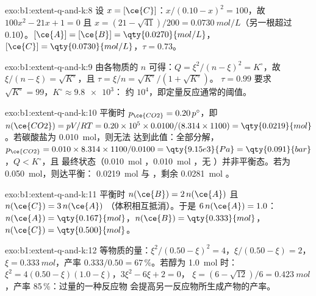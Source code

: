 \begin{solution}{exo:b1:extent-q-and-k:8}
设 $x = [\ce{C}]$：$x/(0.10 - x)^2 = 100$，故 $100x^2 - 21x + 1 = 0$ 且
$x = (21 - \sqrt{41})/200 = \qty{0.0730}{mol/L}$（另一根超过
0.10）。$[\ce{A}] = [\ce{B}] = \qty{0.0270}{mol/L}$，$[\ce{C}] =
\qty{0.0730}{mol/L}$，$\tau = 0.73$。
\end{solution}

\begin{solution}{exo:b1:extent-q-and-k:9}
由各物质的 $n$ 可得：$Q = \xi^2/(n - \xi)^2 = K^\circ$，故 $\xi/(n - \xi) =
\sqrt{K^\circ}$，且 $\tau = \xi/n = \sqrt{K^\circ}/(1 + \sqrt{K^\circ})$。
$\tau = 0.99$ 要求 $\sqrt{K^\circ} = 99$，$K^\circ \approx \num{9.8e3}$：
约 $10^4$，即定量反应通常的阈值。
\end{solution}

\begin{solution}{exo:b1:extent-q-and-k:10}
平衡时 $p_{\ce{CO2}} = 0.20\,p^\circ$，即 $n(\ce{CO2}) =
pV/RT = 0.20 \times 10^5 \times 0.0100/(8.314 \times 1100) =
\qty{0.0219}{mol}$。若碳酸盐为 \qty{0.010}{mol}，则无法
达到此值：全部分解，$p_{\ce{CO2}} = 0.010 \times 8.314 \times
1100/0.0100 = \qty{9.15e3}{Pa} = \qty{0.091}{bar}$，$Q < K^\circ$，且
最终状态（\qty{0.010}{mol} ，\qty{0.010}{mol} ，无
）并非平衡态。若为 \qty{0.050}{mol}，则达平衡：
\qty{0.0219}{mol}  与 ，剩余 \qty{0.0281}{mol} 。
\end{solution}

\begin{solution}{exo:b1:extent-q-and-k:11}
平衡时 $n(\ce{B}) = 2\,n(\ce{A})$ 且 $n(\ce{C}) = 3\,n(\ce{A})$
（体积相互抵消）。于是 $6\,n(\ce{A}) = 1.0$：$n(\ce{A}) =
\qty{0.167}{mol}$，$n(\ce{B}) = \qty{0.333}{mol}$，$n(\ce{C}) =
\qty{0.500}{mol}$。
\end{solution}

\begin{solution}{exo:b1:extent-q-and-k:12}
等物质的量：$\xi^2/(0.50 - \xi)^2 = 4$，$\xi/(0.50 - \xi) = 2$，
$\xi = \qty{0.333}{mol}$，产率 $0.333/0.50 = 67\,\%$。若醇为 \qty{1.0}{mol}
时：$\xi^2 = 4(0.50 - \xi)(1.0 - \xi)$，$3\xi^2 - 6\xi + 2 = 0$，
$\xi = (6 - \sqrt{12})/6 = \qty{0.423}{mol}$，产率 85\,\%：过量的一种反应物
会提高另一反应物所生成产物的产率。
\end{solution}

